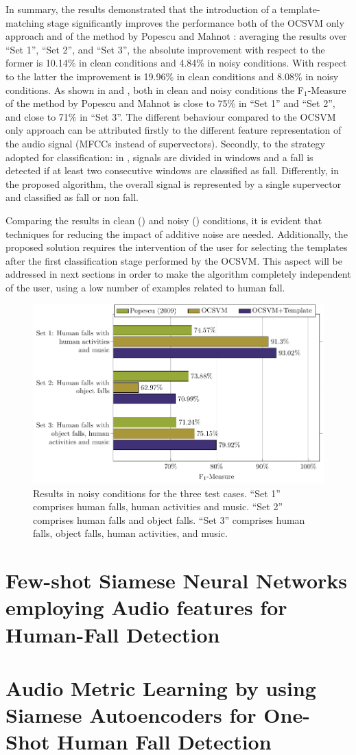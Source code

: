 In summary, the results demonstrated that the introduction of a template-matching stage significantly improves the performance both of the OCSVM only approach and of the method by Popescu and Mahnot \cite{Popescu2009}: averaging the results over ``Set 1'', ``Set 2'', and ``Set 3'', the absolute improvement with respect to the former is 10.14\% in clean conditions and 4.84\% in noisy conditions. With respect to the latter \cite{Popescu2009} the improvement is 19.96\% in clean conditions and 8.08\% in noisy conditions. As shown in  and , both in clean and noisy conditions the F$_1$-Measure of the method by Popescu and Mahnot \cite{Popescu2009} is close to 75\% in ``Set 1'' and ``Set 2'', and close to 71\% in ``Set 3''. The different behaviour compared to the OCSVM only approach can be attributed firstly to the different feature representation of the audio signal (MFCCs instead of supervectors). Secondly, to the strategy adopted for classification: in \cite{Popescu2009}, signals are divided in windows and a fall is detected if at least two consecutive windows are classified as fall. Differently, in the proposed algorithm, the overall signal is represented by a single supervector and classified as fall or non fall.

Comparing the results in clean () and noisy () conditions, it is evident that techniques for reducing the impact of additive noise are needed. Additionally, the proposed solution requires the intervention of the user for selecting the templates after the first classification stage performed by the OCSVM. This aspect will be addressed in next sections in order to make the algorithm completely independent of the user, using a low number of examples related to human fall.

\begin{figure}[t]
	\centering
	\includegraphics[width=\columnwidth]{img/cin/res_noisy.pdf}
	\caption{Results in noisy conditions for the three test cases. ``Set 1'' comprises human falls, human activities and music. ``Set 2'' comprises human falls and object falls. ``Set 3'' comprises human falls, object falls, human activities, and music.} \label{fig:res_noisy_}
\end{figure}
\section{Few-shot Siamese Neural Networks employing Audio features
for Human-Fall Detection}
\label{sec:siamese_few_shot}
\section{Audio Metric Learning by using Siamese Autoencoders
for One-Shot Human Fall Detection}
\label{sec:siamese_one_shot}